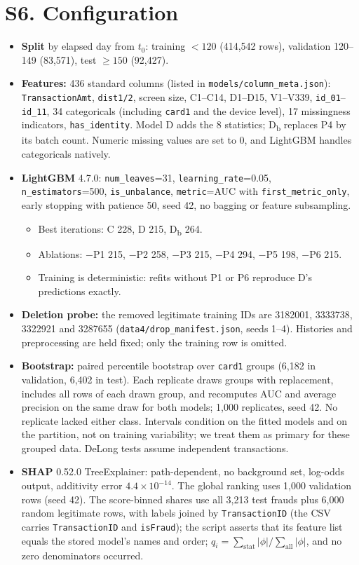 \documentclass[10pt]{article}
\newcommand{\tf}[1]{\texttt{#1}}
\begin{document}
\section*{S6. Configuration}
\begin{itemize}\itemsep1pt
\item \textbf{Split} by elapsed day from $t_0$: training $<120$ (414,542 rows), validation 120--149 (83,571), test $\ge150$ (92,427).
\item \textbf{Features:} 436 standard columns (listed in \tf{models/column\_meta.json}): \tf{TransactionAmt}, \tf{dist1/2}, screen size, C1--C14, D1--D15, V1--V339, \tf{id\_01}--\tf{id\_11}, 34 categoricals (including \tf{card1} and the device level), 17 missingness indicators, \tf{has\_identity}. Model D adds the 8 statistics; D\textsubscript{b} replaces P4 by its batch count. Numeric missing values are set to 0, and LightGBM handles categoricals natively.
\item \textbf{LightGBM} 4.7.0: \tf{num\_leaves}=31, \tf{learning\_rate}=0.05, \tf{n\_estimators}=500, \tf{is\_unbalance}, \tf{metric}=AUC with \tf{first\_metric\_only}, early stopping with patience 50, seed 42, no bagging or feature subsampling.
\begin{itemize}
\item Best iterations: C 228, D 215, D\textsubscript{b} 264.
\item Ablations: $-$P1 215, $-$P2 258, $-$P3 215, $-$P4 294, $-$P5 198, $-$P6 215.
\item Training is deterministic: refits without P1 or P6 reproduce D's predictions exactly.
\end{itemize}
\item \textbf{Deletion probe:} the removed legitimate training IDs are 3182001, 3333738, 3322921 and 3287655 (\tf{data4/drop\_manifest.json}, seeds 1--4). Histories and preprocessing are held fixed; only the training row is omitted.
\item \textbf{Bootstrap:} paired percentile bootstrap over \tf{card1} groups (6,182 in validation, 6,402 in test). Each replicate draws groups with replacement, includes all rows of each drawn group, and recomputes AUC and average precision on the same draw for both models; 1,000 replicates, seed 42. No replicate lacked either class. Intervals condition on the fitted models and on the partition, not on training variability; we treat them as primary for these grouped data. DeLong tests assume independent transactions.
\item \textbf{SHAP} 0.52.0 TreeExplainer: path-dependent, no background set, log-odds output, additivity error $4.4\times10^{-14}$. The global ranking uses 1,000 validation rows (seed 42). The score-binned shares use all 3,213 test frauds plus 6,000 random legitimate rows, with labels joined by \tf{TransactionID} (the CSV carries \tf{TransactionID} and \tf{isFraud}); the script asserts that its feature list equals the stored model's names and order; $q_i=\sum_{\text{stat}}|\phi|/\sum_{\text{all}}|\phi|$, and no zero denominators occurred.

\end{itemize}
\end{document}
